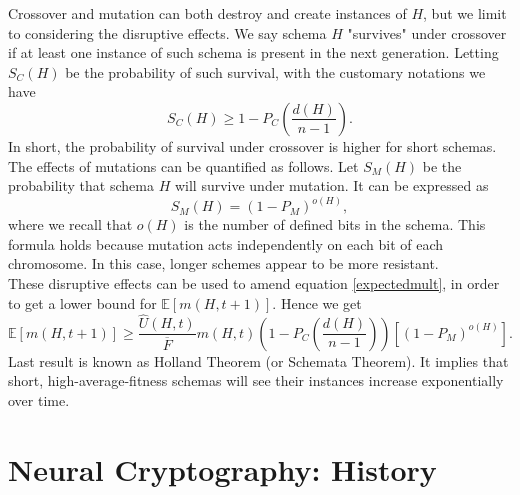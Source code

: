 \documentclass[%
    corpo=11pt,
    twoside,
    stile=classica,
    oldstyle,
    autoretitolo,
    tipotesi=magistrale,
    greek,
    evenboxes,
    english
]{toptesi}
\begin{document}
Crossover and mutation can both destroy and create instances of $H$, but we limit to considering the disruptive effects. We say schema $H$ "survives" under crossover if at least one instance of such schema is present in the next generation. Letting $S_C(H)$ be the probability of such survival, with the customary notations we have
\begin{equation}
S_C(H) \geq 1 - P_C\left(\frac{d(H)}{n-1} \right).
\end{equation}
In short, the probability of survival under crossover is higher for short schemas. \\
The effects of mutations can be quantified as follows. Let $S_M(H)$ be the probability that schema $H$ will survive under mutation. It can be expressed as
\begin{equation}
S_M(H) = (1-P_M)^{o(H)},
\end{equation}
where we recall that $o(H)$ is the number of defined bits in the schema. This formula holds because mutation acts independently on each bit of each chromosome. In this case, longer schemes appear to be more resistant. \\
These disruptive effects can be used to amend equation \eqref{expectedmult}, in order to get a lower bound for $\mathbb{E}\left[m(H, t + 1) \right]$. Hence we get
\begin{equation}
\mathbb{E}\left[m(H, t + 1) \right] \geq \frac{\hat{U}(H,t)}{\overline{F}}m(H,t)\left( 1 - P_C\left(\frac{d(H)}{n-1} \right)\right)\left[ (1-P_M)^{o(H)}\right].
\end{equation}
Last result is known as Holland Theorem (or Schemata Theorem). It implies that short, high-average-fitness schemas will see their instances increase exponentially over time.

\chapter{Neural Cryptography: History}
\end{document}
